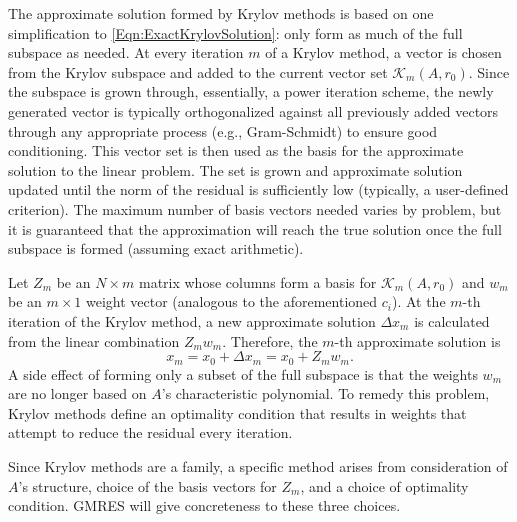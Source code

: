\documentclass[Prelim,12pt]{WisconsinThesis}
\newcommand{\by}    {\!\times\!}
\begin{document}
The approximate solution formed by Krylov methods is based on one simplification to \cref{Eqn:ExactKrylovSolution}: only form as much of the full subspace as needed.
At every iteration $m$ of a Krylov method, a vector is chosen from the Krylov subspace and added to the current vector set $\mathcal{K}_m(A,r_0)$.
Since the subspace is grown through, essentially, a power iteration scheme, the newly generated vector is typically orthogonalized against all previously added vectors through any appropriate process (e.g., Gram-Schmidt) to ensure good conditioning.
This vector set is then used as the basis for the approximate solution to the linear problem.
The set is grown and approximate solution updated until the norm of the residual is sufficiently low (typically, a user-defined criterion).
The maximum number of basis vectors needed varies by problem, but it is guaranteed that the approximation will reach the true solution once the full subspace is formed (assuming exact arithmetic).


Let $Z_m$ be an $N \by m$ matrix whose columns form a basis for $\mathcal{K}_m(A,r_0)$ and $w_m$ be an $m \by 1$ weight vector (analogous to the aforementioned $c_i$).
At the $m$-th iteration of the Krylov method, a new approximate solution $\Delta{x}_m$ is calculated from the linear combination $Z_m w_m$.
Therefore, the $m$-th approximate solution is
\begin{equation}
    x_m = x_0 + \Delta{x}_m = x_0 + Z_m w_m.
    \label{Eqn:ApproximateKrylovSolution}
\end{equation}
A side effect of forming only a subset of the full subspace is that the weights $w_m$ are no longer based on $A$'s characteristic polynomial.
To remedy this problem, Krylov methods define an optimality condition that results in weights that attempt to reduce the residual every iteration.


Since Krylov methods are a family, a specific method arises from consideration of $A$'s structure, choice of the basis vectors for $Z_m$, and a choice of optimality condition.
GMRES will give concreteness to these three choices.
\end{document}
